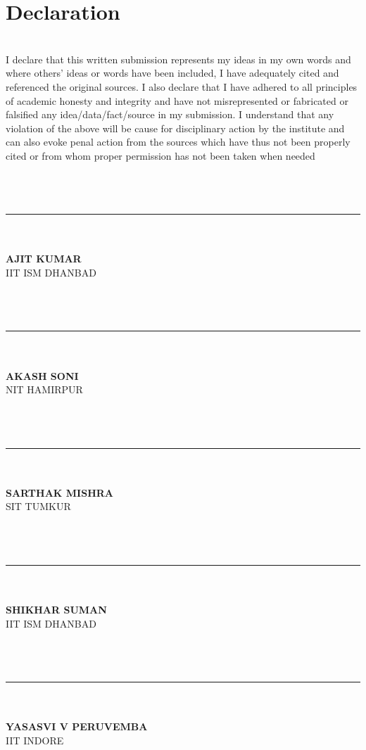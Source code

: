 \documentclass[12pt]{article}
\begin{document}
\section{Declaration}
\textbf{\\}
I declare that this written submission represents my ideas in my own words and where others’ ideas or words have been included, I have adequately cited and referenced the original sources. I also declare that I have adhered to all principles of academic honesty and integrity and have not misrepresented or fabricated or falsified any idea/data/fact/source in my submission. I understand that any violation of the above will be cause for disciplinary action by the institute and can also evoke penal action from the sources which have thus not been properly cited or from whom proper permission has not been taken when needed
\textbf{\\\\\\\\}
\begin{multicols}{2}
\noindent\rule{5cm}{0.4pt}\\
\textbf{\\AJIT KUMAR} \\
IIT ISM  DHANBAD\\
\textbf{\\\\\\}
\noindent\rule{5cm}{0.4pt}\\
\textbf{\\AKASH SONI} \\
NIT HAMIRPUR\\
\textbf{\\\\\\}
\noindent\rule{5cm}{0.4pt}\\
\textbf{\\SARTHAK MISHRA} \\
SIT TUMKUR\\
\textbf{\\\\\\}
\columnbreak

\noindent\rule{5cm}{0.4pt}\\
\textbf{\\SHIKHAR SUMAN} \\
IIT ISM  DHANBAD\\
\textbf{\\\\\\}
\noindent\rule{5cm}{0.4pt}\\
\textbf{\\YASASVI V PERUVEMBA} \\
IIT INDORE\\
\textbf{\\\\}
\end{multicols}
\pagebreak
\end{document}
